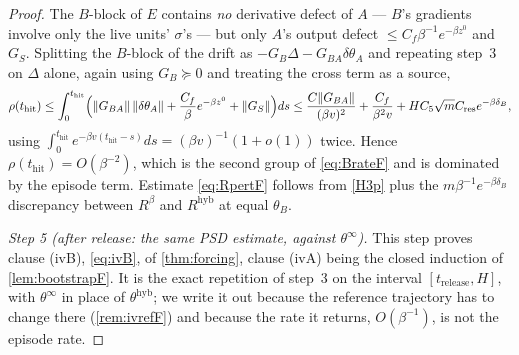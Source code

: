 \documentclass[11pt]{article}
\theoremstyle{definition}
\theoremstyle{remark}
\newcommand{\thit}{t_{\mathrm{hit}}}
\newcommand{\trel}{t_{\mathrm{release}}}
\newcommand{\hyb}{\mathrm{hyb}}
\begin{document}
\begin{proof}
The $B$-block of $E$ contains \emph{no} derivative defect of $A$ --- $B$'s
gradients involve only the live units' $\sigma$'s --- but only $A$'s output
defect $\le C_f\beta^{-1}e^{-\beta z^0}$ and $G_S$. Splitting the $B$-block of
the drift as $-G_B\Delta-G_{BA}\delta\theta_A$ and repeating step~3 on $\Delta$
alone, again using $G_B\succeq0$ and treating the cross term as a source,
\[
\rho(\thit)\le\int_0^{\thit}\Bigl(\|G_{BA}\|\,\|\delta\theta_A\|
+\frac{C_f}{\beta}e^{-\beta z^0}+\|G_S\|\Bigr)ds
\le\frac{C\|G_{BA}\|}{(\beta v)^2}+\frac{C_f}{\beta^2v}
+HC_5\sqrt mC_{\mathrm{res}}e^{-\beta\delta_B},
\]
using $\int_0^{\thit}e^{-\beta v(\thit-s)}ds=(\beta v)^{-1}(1+o(1))$ twice.
Hence $\rho(\thit)=O(\beta^{-2})$, which is the second group of
\eqref{eq:BrateF} and is dominated by the episode term. Estimate
\eqref{eq:RpertF} follows from \eqref{H3p} plus the $m\beta^{-1}e^{-\beta\delta_B}$
discrepancy between $R^\beta$ and $R^{\hyb}$ at equal $\theta_B$.

\emph{Step 5 (after release: the same PSD estimate, against $\theta^\infty$).}
This step proves clause (ivB), \eqref{eq:ivB}, of \cref{thm:forcing}, clause
(ivA) being the closed induction of \cref{lem:bootstrapF}. It is the exact
repetition of step~3 on the interval $[\trel,H]$, with $\theta^\infty$ in place
of $\theta^{\hyb}$; we write it out because the reference trajectory has to
change there (\cref{rem:ivrefF}) and because the rate it returns,
$O(\beta^{-1})$, is not the episode rate.


\end{proof}
\end{document}
